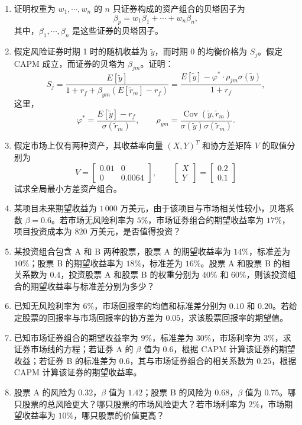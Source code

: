 \documentclass{article}
\begin{document}
\begin{enumerate}[label=\textbf{\arabic*.}]
\item 证明权重为 \(w_1,\cdots,w_n\) 的 \(n\) 只证券构成的资产组合的贝塔因子为
\[
\beta_p=w_1\beta_1+\cdots+w_n\beta_n,
\]
其中，\(\beta_1,\cdots,\beta_n\) 是这些证券的贝塔因子。

\item 假定风险证券时期 1 时的随机收益为 \(\tilde{y}\)，而时期 0 的均衡价格为 \(S_j\)。假定 CAPM 成立，而证券的贝塔为 \(\beta_{jm}\)。证明：
\[
S_j=\frac{E[\tilde{y}]}{1+r_f+\beta_{ym}(E[\tilde{r}_m]-r_f)}
=\frac{E[\tilde{y}]-\varphi^*\cdot\rho_{jm}\sigma(\tilde{y})}{1+r_f},
\]
这里，
\[
\varphi^*=\frac{E[\tilde{y}]-r_f}{\sigma(\tilde{r}_m)},\qquad
\rho_{ym}=\frac{\operatorname{Cov}(\tilde{y},\tilde{r}_m)}{\sigma(\tilde{y})\sigma(\tilde{r}_m)}.
\]

\item 假定市场上仅有两种资产，其收益率向量 \((X,Y)^T\) 和协方差矩阵 \(V\) 的取值分别为
\[
V=\begin{bmatrix}
0.01 & 0\\
0 & 0.0064
\end{bmatrix},\qquad
\begin{bmatrix}
X\\
Y
\end{bmatrix}
=
\begin{bmatrix}
0.2\\
0.1
\end{bmatrix}
\]
试求全局最小方差资产组合。

\item 某项目未来期望收益为 \(1\,000\) 万美元，由于该项目与市场相关性较小，贝塔系数 \(\beta=0.6\)。若市场无风险利率为 \(5\%\)，市场证券组合的期望收益率为 \(17\%\)，项目投资成本为 \(820\) 万美元，是否值得投资？

\item 某投资组合包含 A 和 B 两种股票，股票 A 的期望收益率为 \(14\%\)，标准差为 \(10\%\)；股票 B 的期望收益率为 \(18\%\)，标准差为 \(16\%\)。股票 A 和股票 B 的相关系数为 \(0.4\)，投资股票 A 和股票 B 的权重分别为 \(40\%\) 和 \(60\%\)，则该投资组合的期望收益率与标准差分别为多少？

\item 已知无风险利率为 \(6\%\)，市场回报率的均值和标准差分别为 \(0.10\) 和 \(0.20\)。若给定股票的回报率与市场回报率的协方差为 \(0.05\)，求该股票回报率的期望值。

\item 已知市场证券组合的期望收益率为 \(9\%\)，标准差为 \(30\%\)，市场利率为 \(3\%\)，求证券市场线的方程；若证券 A 的 \(\beta\) 值为 \(0.6\)，根据 CAPM 计算该证券的期望收益；若证券 B 的标准差为 \(0.6\)，其与市场证券组合的相关系数为 \(0.25\)，根据 CAPM 计算该证券的期望收益率。

\item 股票 A 的风险为 \(0.32\)，\(\beta\) 值为 \(1.42\)；股票 B 的风险为 \(0.68\)，\(\beta\) 值为 \(0.75\)。哪只股票的总风险更大？哪只股票的市场风险更大？若市场利率为 \(2\%\)，市场期望收益率为 \(10\%\)，哪只股票的价值更高？

\end{enumerate}
\end{document}

